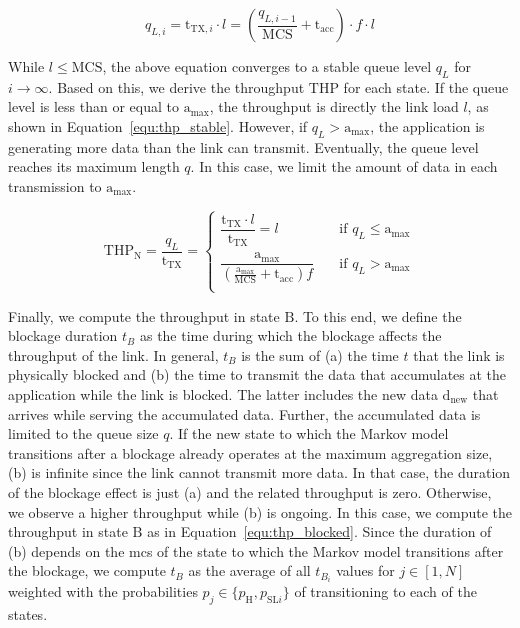 \documentclass{article}
\begin{document}
\begin{equation}
	q_{L,i} = \text{t}_{\text{TX}, i} \cdot l = \left( \frac{q_{L,i-1}}{\text{MCS}} + \text{t}_\text{acc} \right) \cdot f \cdot l
\label{equ:queue_levels}
\end{equation}

While $l \leq \text{MCS}$, the above equation converges to a stable queue level $q_L$ for $i \rightarrow \infty$. Based on this, we derive the throughput $\text{THP}$ for each state. If the queue level is less than or equal to $\text{a}_\text{max}$, the throughput is directly the link load $l$, as shown in Equation~\ref{equ:thp_stable}. However, if $q_L > \text{a}_\text{max}$, the application is generating more data than the link can transmit. Eventually, the queue level reaches its maximum length $q$. In this case, we limit the amount of data in each transmission to $\text{a}_\text{max}$.

\vspace{-3mm}
\begin{equation}
\text{THP}_\text{N} = \frac{q_L}{\text{t}_\text{TX}} =
  \begin{cases}
    \dfrac{\text{t}_\text{TX} \cdot l}{\text{t}_\text{TX}} = l       & \quad \text{if } q_L \leq \text{a}_\text{max}\\[4mm]
    \dfrac{\text{a}_\text{max}}{\left( \frac{\text{a}_\text{max}}{\text{MCS}} + \text{t}_\text{acc} \right) f}  & \quad \text{if } q_L > \text{a}_\text{max}\\
  \end{cases}
  \label{equ:thp_stable}
\end{equation}

Finally, we compute the throughput in state $\text{B}$. To this end, we define the blockage duration $t_B$ as the time during which the blockage affects the throughput of the link. In general, $t_B$ is the sum of (a) the time $t$ that the link is physically blocked and (b) the time to transmit the data that accumulates at the application while the link is blocked. The latter includes the new data $\text{d}_\text{new}$ that arrives while serving the accumulated data. Further, the accumulated data is limited to the queue size $q$. If the new state to which the Markov model transitions after a blockage already operates at the maximum aggregation size, (b) is infinite since the link cannot transmit more data. In that case, the duration of the blockage effect is just (a) and the related throughput is zero. Otherwise, we observe a higher throughput while (b) is ongoing. In this case, we compute the throughput in state $\text{B}$ as in Equation~\ref{equ:thp_blocked}. Since the duration of (b) depends on the \ac{mcs} of the state to which the Markov model transitions after the blockage, we compute $t_B$ as the average of all $t_{B_i}$ values for $j \in [1, N]$ weighted with the probabilities $p_j \in \{p_\text{H}, p_{\text{SL}i}\}$ of transitioning to each of the states.
\end{document}
